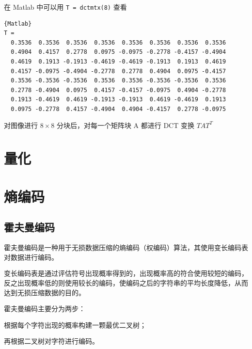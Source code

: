 在 Matlab 中可以用 \lstinline|T = dctmtx(8)| 查看
\begin{lstlisting}{Matlab}
T =
  0.3536  0.3536  0.3536  0.3536  0.3536  0.3536  0.3536  0.3536
  0.4904  0.4157  0.2778  0.0975 -0.0975 -0.2778 -0.4157 -0.4904
  0.4619  0.1913 -0.1913 -0.4619 -0.4619 -0.1913  0.1913  0.4619
  0.4157 -0.0975 -0.4904 -0.2778  0.2778  0.4904  0.0975 -0.4157
  0.3536 -0.3536 -0.3536  0.3536  0.3536 -0.3536 -0.3536  0.3536
  0.2778 -0.4904  0.0975  0.4157 -0.4157 -0.0975  0.4904 -0.2778
  0.1913 -0.4619  0.4619 -0.1913 -0.1913  0.4619 -0.4619  0.1913
  0.0975 -0.2778  0.4157 -0.4904  0.4904 -0.4157  0.2778 -0.0975
\end{lstlisting}

对图像进行 $8\times 8$ 分块后，对每一个矩阵块 A 都进行 DCT 变换 $TAT^T$ 

\section{量化}
\section{熵编码}
\subsection{霍夫曼编码}
霍夫曼编码是一种用于无损数据压缩的熵编码（权编码）算法，其使用变长编码表对数据进行编码。

变长编码表是通过评估符号出现概率得到的，出现概率高的符合使用较短的编码，反之出现概率低的则使用较长的编码，使编码之后的字符串的平均长度降低，从而达到无损压缩数据的目的。

霍夫曼编码主要分为两步：

根据每个字符出现的概率构建一颗最优二叉树；

再根据二叉树对字符进行编码。
